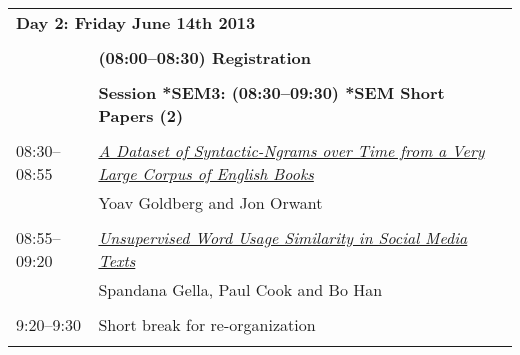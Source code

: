 \begin{tabular}{p{20mm}p{138mm}}
\multicolumn{2}{l}{\bf Day 2: Friday June 14th 2013} \\
\\
 & {\bf (08:00--08:30) Registration} \\
\\
 & {\bf Session *SEM3: (08:30--09:30) *SEM Short Papers (2)} \\
\\
08:30--08:55 & \hyperlink{page.241}{\em A Dataset of Syntactic-Ngrams over Time from a Very Large Corpus of English Books}\\
         & Yoav Goldberg and Jon Orwant \\
\\

08:55--09:20 & \hyperlink{page.248}{\em Unsupervised Word Usage Similarity in Social Media Texts}\\
         & Spandana Gella, Paul Cook and Bo Han \\
\\

9:20--9:30 & Short break for re-organization \\
\\
\end{tabular}
\newpage
